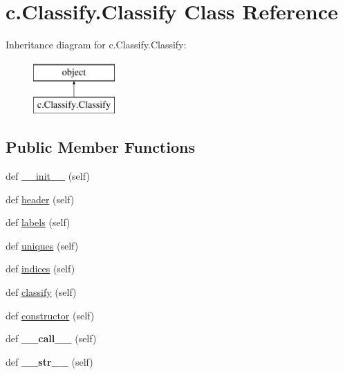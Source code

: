 \hypertarget{classc_1_1_classify_1_1_classify}{}\section{c.\+Classify.\+Classify Class Reference}
\label{classc_1_1_classify_1_1_classify}
Inheritance diagram for c.\+Classify.\+Classify\+:\begin{figure}[H]
\begin{center}
\leavevmode
\includegraphics[height=2.000000cm]{classc_1_1_classify_1_1_classify}
\end{center}
\end{figure}
\subsection*{Public Member Functions}
\begin{DoxyCompactItemize}
\item 
def \hyperlink{classc_1_1_classify_1_1_classify_a398279537ff57bdd2d903fdfa2c398bf}{\+\_\+\+\_\+init\+\_\+\+\_\+} (self)
\item 
def \hyperlink{classc_1_1_classify_1_1_classify_a76c7951d7b300167925e145e58ed3fa3}{header} (self)
\item 
def \hyperlink{classc_1_1_classify_1_1_classify_a5d8e1a6fbcbab785107f9e3a40b7e154}{labels} (self)
\item 
def \hyperlink{classc_1_1_classify_1_1_classify_ace6a8a06833cfe31d3abcbce270817ad}{uniques} (self)
\item 
def \hyperlink{classc_1_1_classify_1_1_classify_a7c4ec3de2e18e3db3a03ddbca71ccba6}{indices} (self)
\item 
def \hyperlink{classc_1_1_classify_1_1_classify_ae0bfdd4ee16c94394efc666b4c501bcc}{classify} (self)
\item 
def \hyperlink{classc_1_1_classify_1_1_classify_ab723602c25ed262d0c38114d6f8da7bc}{constructor} (self)
\item 
def {\bfseries \+\_\+\+\_\+call\+\_\+\+\_\+} (self)\hypertarget{classc_1_1_classify_1_1_classify_a178781aedac62cb6da8ef6cd71071b12}{}\label{classc_1_1_classify_1_1_classify_a178781aedac62cb6da8ef6cd71071b12}

\item 
def {\bfseries \+\_\+\+\_\+str\+\_\+\+\_\+} (self)\hypertarget{classc_1_1_classify_1_1_classify_a45fb26bfae7f894804ed286cac33f379}{}\label{classc_1_1_classify_1_1_classify_a45fb26bfae7f894804ed286cac33f379}

\end{DoxyCompactItemize}
